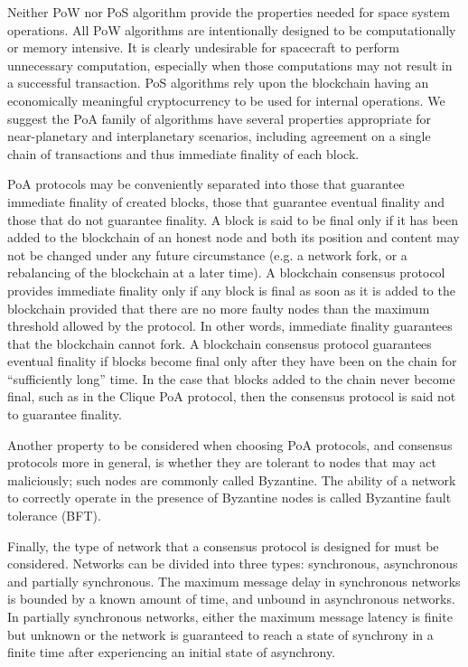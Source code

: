 \documentclass[]{aiaa-tc}%
\begin{document}
Neither PoW nor PoS algorithm provide the properties needed for space system operations. All PoW algorithms are intentionally designed to be computationally or memory intensive. It is clearly undesirable for spacecraft to perform unnecessary computation, especially when those computations may not result in a successful transaction. PoS algorithms rely upon the blockchain having an economically meaningful cryptocurrency to be used for internal operations. We suggest the PoA family of algorithms have several properties appropriate for near-planetary and interplanetary scenarios, including agreement on a single chain of transactions and thus immediate finality of each block.

PoA protocols may be conveniently separated into those that guarantee immediate finality of created blocks, those that guarantee eventual finality and those that do not guarantee finality. A block is said to be final only if it has been added to the blockchain of an honest node and both its position and content may not be changed under any future circumstance (e.g. a network fork, or a rebalancing of the blockchain at a later time). A blockchain consensus protocol provides immediate finality only if any block is final as soon as it is added to the blockchain provided that there are no more faulty nodes than the maximum threshold allowed by the protocol. In other words, immediate finality guarantees that the blockchain cannot fork. A blockchain consensus protocol guarantees eventual finality if blocks become final only after they have been on the chain for ``sufficiently long'' time. In the case that blocks added to the chain never become final, such as in the Clique PoA protocol\cite{Szilagyi-Clique}, then the consensus protocol is said not to guarantee finality.

Another property to be considered when choosing PoA protocols, and consensus protocols more in general, is whether they are tolerant to nodes that may act maliciously; such nodes are commonly called Byzantine\cite{lamport1982byzantine}. The ability of a network to correctly operate in the presence of Byzantine nodes is called Byzantine fault tolerance (BFT).

Finally, the type of network that a consensus protocol is designed for must be considered. Networks can be divided into three types: synchronous, asynchronous and partially synchronous\cite{dwork1988consensus}. The maximum message delay in synchronous networks is bounded by a known amount of time, and unbound in asynchronous networks. In partially synchronous networks, either the maximum message latency is finite but unknown or the network is guaranteed to reach a state of synchrony in a finite time after experiencing an initial state of asynchrony.
\end{document}
